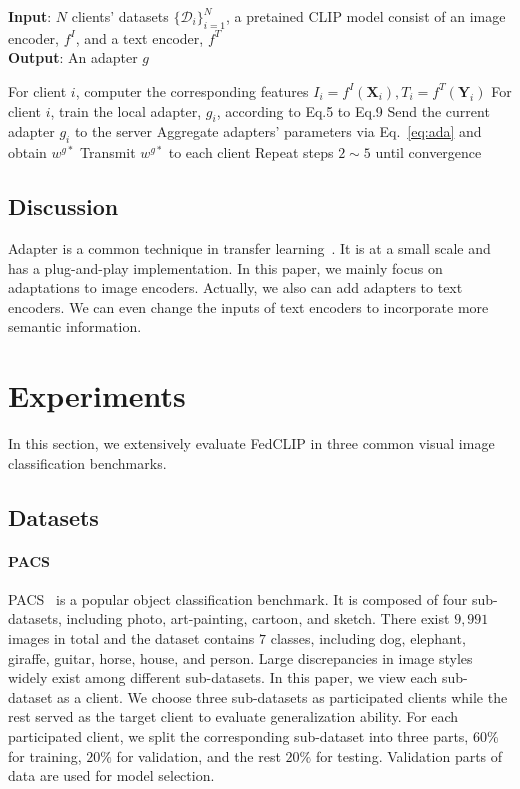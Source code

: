 \documentclass[11pt]{article}
\newcommand{\equationname}{Eq.}
\newcommand{\method}{FedCLIP\xspace}
\begin{document}
\begin{algorithm}[htb]
\caption{\method}
\label{alg:adafed}
\textbf{Input}: $N$ clients' datasets $\{\mathcal{D}_i\}_{i=1}^N$, a pretained CLIP model consist of an image encoder, $f^I$, and a text encoder, $f^T$\\
\textbf{Output}: An adapter $g$
\begin{algorithmic}[1] %
\State For client $i$, computer the corresponding features $I_i=f^I(\mathbf{X}_i), T_i=f^T(\mathbf{Y}_i)$
\State For client $i$, train the local adapter, $g_i$, according to \equationname 5 to \equationname 9
\State Send the current adapter $g_i$ to the server
\State Aggregate adapters' parameters via \equationname~\ref{eq:ada} and obtain $w^{g*}$
\State Transmit $w^{g*}$ to each client
\State Repeat steps $2 \sim 5$ until convergence
\end{algorithmic}
\end{algorithm}

\subsection{Discussion}
Adapter is a common technique in transfer learning~\cite{wenxinhou22}.
It is at a small scale and has a plug-and-play implementation.
In this paper, we mainly focus on adaptations to image encoders.
Actually, we also can add adapters to text encoders.
We can even change the inputs of text encoders to incorporate more semantic information.

\section{Experiments}
\label{sec:exp}

In this section, we extensively evaluate \method in three common visual image classification benchmarks.

\subsection{Datasets}
\paragraph{PACS} PACS~\cite{li2017deeper} is a popular object classification benchmark.
It is composed of four sub-datasets, including photo, art-painting, cartoon, and sketch.
There exist $9,991$ images in total and the dataset contains $7$ classes, including dog, elephant, giraffe, guitar, horse, house, and person.
Large discrepancies in image styles widely exist among different sub-datasets.
In this paper, we view each sub-dataset as a client.
We choose three sub-datasets as participated clients while the rest served as the target client to evaluate generalization ability.
For each participated client, we split the corresponding sub-dataset into three parts, $60\%$ for training, $20\%$ for validation, and the rest $20\%$ for testing.
Validation parts of data are used for model selection.
\end{document}
